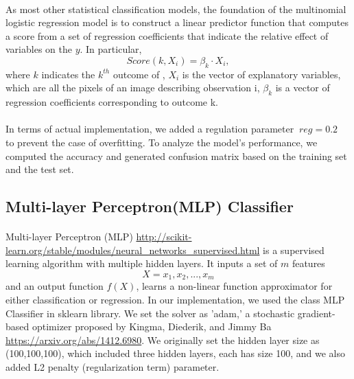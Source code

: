 \documentclass{article}
\begin{document}
\paragraph{}
As most other statistical classification models, the foundation of the multinomial logistic regression model is to construct a linear predictor function that computes a score from a set of regression coefficients  that indicate the relative effect of variables on the $y$. In particular, \[
Score(k, X_i) = \beta_k \cdot X_i,
\]
where $k$ indicates the $k^{th}$ outcome of , $X_i$ is the vector of explanatory variables, which are all the pixels of an image describing observation i, $\beta_k$ is a vector of  regression coefficients corresponding to outcome k.

\paragraph{}
In terms of actual implementation, we added a regulation parameter $ \ reg=0.2\ $ to prevent the case of overfitting. To analyze the model's performance, we computed the accuracy and generated confusion matrix based on the training set and the test set.

\subsection{Multi-layer Perceptron(MLP) Classifier}
\paragraph{}
Multi-layer Perceptron (MLP) \url{http://scikit-learn.org/stable/modules/neural_networks_supervised.html} is a supervised learning algorithm with multiple hidden layers. It inputs a set of $m$ features \[
X = x_1, x_2, ... , x_m\]
and an output function $f(X)$, learns a non-linear function approximator for either classification or regression. In our implementation, we used the class MLP Classifier in sklearn library. We set the solver as  'adam,' a stochastic gradient-based optimizer proposed by Kingma, Diederik, and Jimmy Ba \url{https://arxiv.org/abs/1412.6980}. We originally set the hidden layer size as (100,100,100), which included three hidden layers, each has size 100, and we also added L2 penalty (regularization term) parameter.
\end{document}
